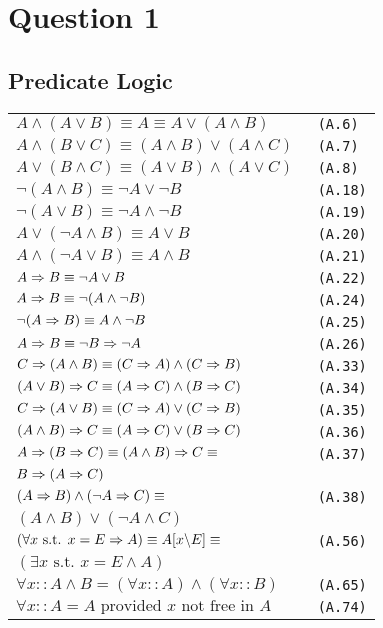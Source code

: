 \section{Question 1}

\subsection{Predicate Logic}

\begin{tabular}{@{}ll@{}}
\fontsize{5pt}{6pt}\selectfont
$ A \land (A \lor B) \equiv A \equiv A \lor (A \land B)$ & \verb! (A.6)! \\
$ A \land (B \lor C) \equiv (A \land B) \lor (A \land C)$ & \verb! (A.7)! \\
$ A \lor (B \land C) \equiv (A \lor B) \land (A \lor C)$ & \verb! (A.8)! \\
$ \neg (A \land B) \equiv \neg A \lor \neg B$ & \verb! (A.18)! \\
$ \neg (A \lor B) \equiv \neg A \land \neg B$ & \verb! (A.19)! \\
$ A \lor (\neg A \land B) \equiv A \lor B$ & \verb! (A.20)! \\
$ A \land (\neg A \lor B) \equiv A \land B$ & \verb! (A.21)! \\
$ A \Rightarrow B \equiv \neg A \lor B$ & \verb! (A.22)! \\
$ A \Rightarrow B \equiv \neg(A \land \neg B)$ & \verb! (A.24)! \\
$ \neg(A \Rightarrow B) \equiv A \land \neg B$ & \verb! (A.25)! \\
$ A \Rightarrow B \equiv \neg B \Rightarrow \neg A$ & \verb! (A.26)! \\
$ C \Rightarrow (A \land B) \equiv (C \Rightarrow A) \land (C \Rightarrow B)$ & \verb! (A.33)! \\
$ (A \lor B) \Rightarrow C \equiv (A \Rightarrow C) \land (B \Rightarrow C)$ & \verb! (A.34)! \\
$ C \Rightarrow (A \lor B) \equiv (C \Rightarrow A) \lor (C \Rightarrow B)$ & \verb! (A.35)! \\
$ (A \land B) \Rightarrow C \equiv (A \Rightarrow C) \lor (B \Rightarrow C)$ & \verb! (A.36)! \\
$ A \Rightarrow (B \Rightarrow C) \equiv (A \land B) \Rightarrow C \equiv$ & \verb! (A.37)! \\
$ B \Rightarrow (A \Rightarrow C)$ & \\
$ (A \Rightarrow B) \land (\neg A \Rightarrow C) \equiv$ & \verb! (A.38)! \\
$ (A \land B) \lor (\neg A \land C)$ & \\
$ (\forall x \text{ s.t. } x = E \Rightarrow A) \equiv A[x \backslash E] \equiv $ & \verb! (A.56)! \\
$ (\exists x \text{ s.t. } x = E \land A)$ & \\
$ \forall x :: A \land B = (\forall x :: A) \land (\forall x :: B)$ & \verb! (A.65)! \\
$ \forall x :: A = A \text{ provided } x \text{ not free in } A$ & \verb! (A.74)! \\
\end{tabular}

